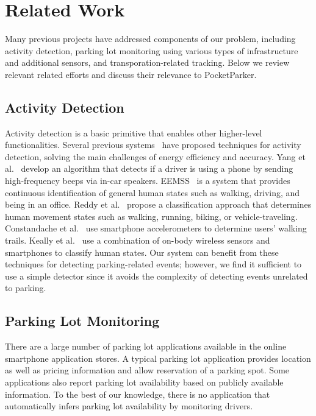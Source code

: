 \section{Related Work}
\label{sec-related}

Many previous projects have addressed components of our problem, including
activity detection, parking lot monitoring using various types of
infrastructure and additional sensors, and transporation-related tracking.
Below we review relevant related efforts and discuss their relevance to
PocketParker.

\subsection{Activity Detection}

Activity detection is a basic primitive that enables other higher-level
functionalities. Several previous systems~\cite{Constandache:2010:DYS,
Keally:2011:PTP, Reddy:2010:UMP, Yang:2011:DDP, Wang:2009:FEE} have proposed
techniques for activity detection, solving the main challenges of energy
efficiency and accuracy. Yang et al.~\cite{Yang:2011:DDP} develop an algorithm
that detects if a driver is using a phone by sending high-frequency beeps via
in-car speakers. EEMSS~\cite{Wang:2009:FEE} is a system that provides continuous
identification of general human states such as walking, driving, and being in an
office. Reddy et al.~\cite{Reddy:2010:UMP} propose a classification approach
that determines human movement states such as walking, running, biking, or
vehicle-traveling. Constandache et al.~\cite{Constandache:2010:DYS} use 
smartphone accelerometers to determine users' walking trails. Keally et
al.~\cite{Keally:2011:PTP} use a combination of on-body wireless sensors and
smartphones to classify human states. Our system can benefit from these
techniques for detecting parking-related events; however, we find it sufficient
to use a simple detector since it avoids the complexity of detecting events
unrelated to parking.

\subsection{Parking Lot Monitoring}

There are a large number of parking lot applications available in the online
smartphone application stores. A typical parking lot application provides
location as well as pricing information and allow reservation of a parking spot.
Some applications also report parking lot availability based on publicly
available information. To the best of our knowledge, there is no application
that automatically infers parking lot availability by monitoring drivers.

